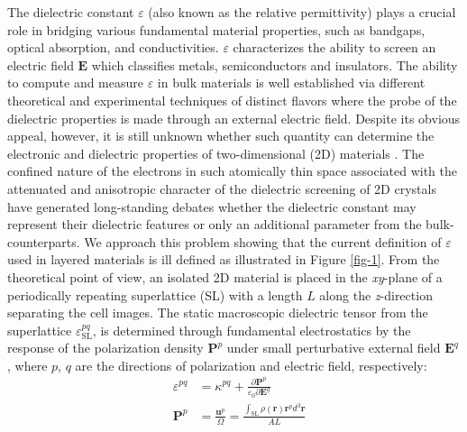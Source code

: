 \documentclass[journal=ancac3,manuscript=article,email=true,hyperref=true,keywords=false]{achemso}
\begin{document}
The dielectric constant $\varepsilon$ (also known as the relative
permittivity) plays a crucial role in bridging various fundamental
material properties, such as bandgaps, optical absorption, and
conductivities.   $\varepsilon$ characterizes
the ability to screen an electric field $\boldsymbol{E}$ which
classifies metals, semiconductors and insulators.  
The ability to compute and measure
$\varepsilon$ in bulk materials is well established via different
theoretical and experimental techniques of distinct flavors where the
probe of the dielectric properties is made through an external
electric field.
%
Despite its obvious appeal, however, it is still unknown whether such quantity can determine the 
electronic and dielectric properties of two-dimensional (2D) materials \cite{Novoselov_2016}.  
%
%
The confined nature of the electrons in such atomically thin space associated with the 
attenuated and anisotropic character of the dielectric screening of 2D crystals 
\cite{Keldysh_1979_eps_multi,Sharma_1985,Low_2014_screening_BP,Cudazzo_2011_screening_2D,Bechstedt_2012,Cudazzo_2010_screen2D,Nazarov_2015_2D_3D}
have generated long-standing debates whether the dielectric constant 
may represent their dielectric features or only an 
additional parameter from the bulk-counterparts. 
We approach this problem showing that the current definition of
$\varepsilon$ used in layered materials is ill defined as illustrated
in Figure \ref{fig-1}.  From the theoretical point of view, an
isolated 2D material is placed in the \textit{xy}-plane of a
periodically repeating superlattice (SL) with a length $L$ along the
\textit{z}-direction separating the cell images. The static macroscopic
dielectric tensor from the superlattice
$\varepsilon_{\mathrm{SL}}^{pq}$, is determined through fundamental
electrostatics by the response of the polarization density
$\boldsymbol{P}^{p}$ under small perturbative external field
$\boldsymbol{E}^{q}$, where $p$, $q$ are the directions of
polarization and electric field,
respectively\cite{Dressel_2001_electrodynamics}:
\begin{subequations}
  \begin{eqnarray}
      \label{eq:def-eps-1}
    &\varepsilon^{pq} &= \kappa^{pq} +
                                 {\displaystyle \frac{\partial \boldsymbol{P}^{p}}
                                 {\varepsilon_{0} \partial \boldsymbol{E}^{q}}} \\
          \label{eq:def-eps-2}
    &\boldsymbol{P}^{p} &=  {\displaystyle \frac{\boldsymbol{u}^{p}}{\Omega}}
                          = {\displaystyle \frac{{\displaystyle
          \int_{\mathrm{SL}} \rho(\boldsymbol{r}) \boldsymbol{r}^{p} d^{3}\boldsymbol{r}}}
                          {AL}}
  \end{eqnarray}
\end{subequations}
\end{document}
